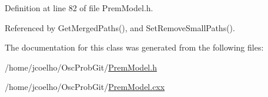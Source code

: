 Definition at line 82 of file Prem\+Model.\+h.



Referenced by Get\+Merged\+Paths(), and Set\+Remove\+Small\+Paths().



The documentation for this class was generated from the following files\+:\begin{DoxyCompactItemize}
\item 
/home/jcoelho/\+Osc\+Prob\+Git/\hyperlink{PremModel_8h}{Prem\+Model.\+h}\item 
/home/jcoelho/\+Osc\+Prob\+Git/\hyperlink{PremModel_8cxx}{Prem\+Model.\+cxx}\end{DoxyCompactItemize}

